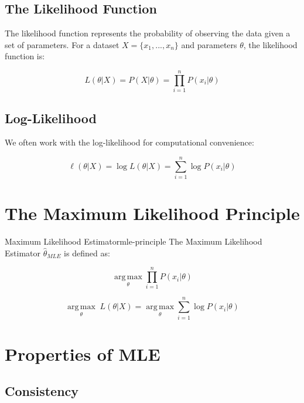 \documentclass[
  12 pt,
  a4paper,
]{book}
\numberwithin{equation}{section}
\theoremstyle{plain}      %
\theoremstyle{definition} %
\theoremstyle{remark}     %
\theoremstyle{note}         %
\begin{document}
\hypertarget{the-likelihood-function}{%
\subsection{The Likelihood Function}\label{the-likelihood-function}}

The likelihood function represents the probability of observing the data
given a set of parameters. For a dataset \(X = \{x_1, ..., x_n\}\) and
parameters \(\theta\), the likelihood function is:

\[L(\theta|X) = P(X|\theta) = \prod_{i=1}^n P(x_i|\theta)\]

\hypertarget{log-likelihood}{%
\subsection{Log-Likelihood}\label{log-likelihood}}

We often work with the log-likelihood for computational convenience:

\[\ell(\theta|X) = \log L(\theta|X) = \sum_{i=1}^n \log P(x_i|\theta)\]

\hypertarget{the-maximum-likelihood-principle}{%
\section{The Maximum Likelihood
Principle}\label{the-maximum-likelihood-principle}}

\begin{a_def_eq}{Maximum Likelihood Estimator}{mle-principle}
The Maximum Likelihood Estimator $\hat{\theta}_{MLE}$ is defined as:

$$\underset{\theta}{\mathop{\mathrm{arg\,max}}} \prod_{i=1}^n P(x_i | \theta)$$

$$\underset{\theta}{\mathop{\mathrm{arg\,max}}}\; L(\theta|X) = \underset{\theta}{\mathop{\mathrm{arg\,max}}} \sum_{i=1}^n \log P(x_i|\theta)$$
\end{a_def_eq}

\hypertarget{properties-of-mle-1}{%
\section{Properties of MLE}\label{properties-of-mle-1}}

\hypertarget{consistency}{%
\subsection{Consistency}\label{consistency}}
\end{document}
